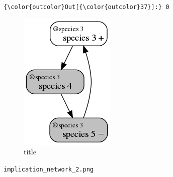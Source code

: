 \documentclass[11pt]{article}
\makeatletter
\def\maxwidth{\ifdim\Gin@nat@width>\linewidth\linewidth
    \else\Gin@nat@width\fi}
\let\Oldincludegraphics\includegraphics
\renewcommand{\includegraphics}[1]{\Oldincludegraphics[width=.8\maxwidth]{#1}}
\makeatother
\begin{document}
\begin{Verbatim}[commandchars=\\\{\}]
{\color{outcolor}Out[{\color{outcolor}37}]:} 0
\end{Verbatim}
            
    \begin{figure}
\centering
\includegraphics{implication_network_2.png}
\caption{title}
\end{figure}

\texttt{implication\_network\_2.png}


    
    
    
    
\end{document}
